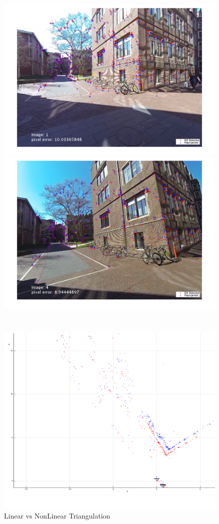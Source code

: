 \documentclass[10pt,letterpaper]{article}
\begin{document}
\begin{enumerate}[]
\begin{figure}[h!]
 \center
  \includegraphics[width=5in]{../images/2D-triangulation-img1}
  \includegraphics[width=5in]{../images/2D-triangulation-img4}
  \caption
   {}
\end{figure} \\

\begin{figure}[h!]
 \center
  \includegraphics[width=5in]{../images/3D_linear_nonlinear_triangulation}
  \caption
   {Linear vs NonLinear Triangulation}
\end{figure} \\


\end{enumerate}
\end{document}
